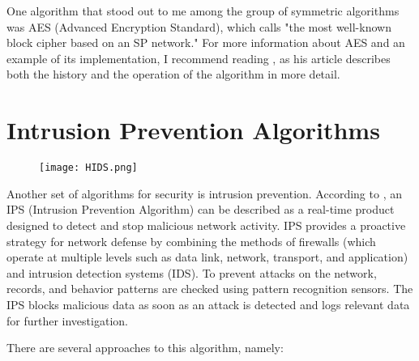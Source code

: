 \documentclass[a4paper,12pt]{report}
\begin{document}
One algorithm that stood out to me among the group of symmetric algorithms was AES (Advanced Encryption Standard), which \cite{DS} calls "the most well-known block cipher based on an SP network." For more information about AES and an example of its implementation, I recommend reading \cite{Douglas}, as his article describes both the history and the operation of the algorithm in more detail.

\section{Intrusion Prevention Algorithms}

\begin{figure}[htp]
    \centering
    \texttt{[image: HIDS.png]}
    \label{fig: Intrusion-Prevention-Algorithms}
\end{figure}

Another set of algorithms for security is intrusion prevention. According to \cite{Deris}, an IPS (Intrusion Prevention Algorithm) can be described as a real-time product designed to detect and stop malicious network activity. IPS provides a proactive strategy for network defense by combining the methods of firewalls (which operate at multiple levels such as data link, network, transport, and application) and intrusion detection systems (IDS). To prevent attacks on the network, records, and behavior patterns are checked using pattern recognition sensors. The IPS blocks malicious data as soon as an attack is detected and logs relevant data for further investigation.

There are several approaches to this algorithm, namely:
\end{document}
